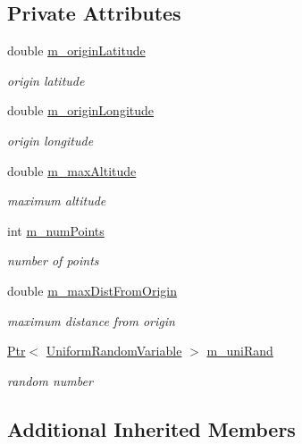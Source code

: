 \subsection*{Private Attributes}
\begin{DoxyCompactItemize}
\item 
double \hyperlink{classRandCartAroundGeoTestCase_a7eba973790d9c9df10e57feaf288507e}{m\+\_\+origin\+Latitude}
\begin{DoxyCompactList}\small\item\em origin latitude \end{DoxyCompactList}\item 
double \hyperlink{classRandCartAroundGeoTestCase_a6d23cde2f19aba3a4487d991823fb963}{m\+\_\+origin\+Longitude}
\begin{DoxyCompactList}\small\item\em origin longitude \end{DoxyCompactList}\item 
double \hyperlink{classRandCartAroundGeoTestCase_a0bbb663d7430e385fcb8edd28ea89618}{m\+\_\+max\+Altitude}
\begin{DoxyCompactList}\small\item\em maximum altitude \end{DoxyCompactList}\item 
int \hyperlink{classRandCartAroundGeoTestCase_ace34f05b40c38d96be98ab93a3dc208e}{m\+\_\+num\+Points}
\begin{DoxyCompactList}\small\item\em number of points \end{DoxyCompactList}\item 
double \hyperlink{classRandCartAroundGeoTestCase_ae853512eccb51970f0dd3857e5e1aed8}{m\+\_\+max\+Dist\+From\+Origin}
\begin{DoxyCompactList}\small\item\em maximum distance from origin \end{DoxyCompactList}\item 
\hyperlink{classns3_1_1Ptr}{Ptr}$<$ \hyperlink{classns3_1_1UniformRandomVariable}{Uniform\+Random\+Variable} $>$ \hyperlink{classRandCartAroundGeoTestCase_afc6b202a99e0a36bba0d2a4c0ce7854b}{m\+\_\+uni\+Rand}
\begin{DoxyCompactList}\small\item\em random number \end{DoxyCompactList}\end{DoxyCompactItemize}
\subsection*{Additional Inherited Members}


